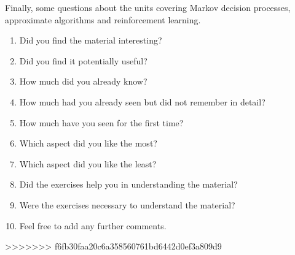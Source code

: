 \documentclass[twoside,a4paper]{article}
\begin{document}
\begin{exercise}
  Finally, some questions about the units covering Markov decision processes,  approximate algorithms and reinforcement learning.
  \begin{enumerate}
  \item Did you find the material interesting?
  \item Did you find it potentially useful?
  \item How much did you already know?
  \item How much had you already seen but did not remember in detail?
  \item How much have you seen for the first time?
  \item Which aspect did you like the most?
  \item Which aspect did you like the least?
  \item Did the exercises help you in understanding the material?
  \item Were the exercises necessary to understand the material?
  \item Feel free to add any further comments.
  \end{enumerate}
\end{exercise}
>>>>>>> f6fb30faa20c6a358560761bd6442d0ef3a809d9
\end{document}
